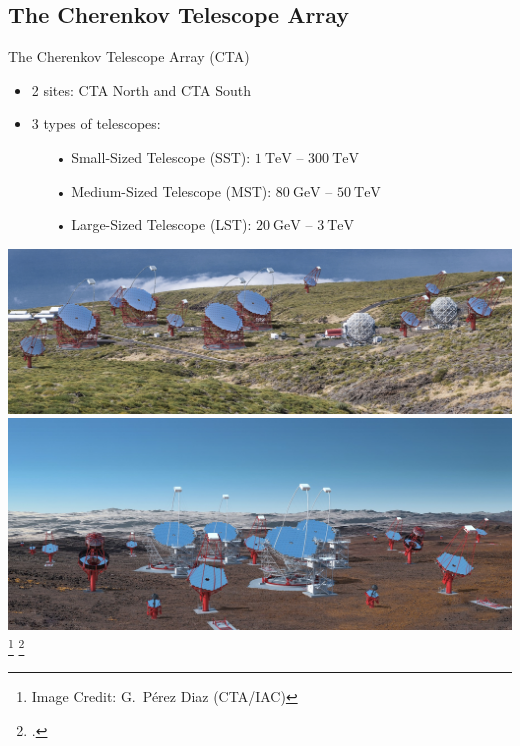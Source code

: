 \subsection{The Cherenkov Telescope Array}

\begin{frame}{The Cherenkov Telescope Array (CTA)}
  \begin{minipage}{0.55\textwidth}
    \begin{itemize}
      \setlength\itemsep{1em}
      \item 2 sites: CTA North and CTA South
      \item 3 types of telescopes:
      \begin{itemize}
        \setlength\itemsep{0.5em}
        \item [•] Small-Sized Telescope (SST): \;\(\SI{1}{\tera\eV}\) -- \(\SI{300}{\tera\eV}\)
        \item [•] Medium-Sized Telescope (MST): \;\(\SI{80}{\giga\eV}\) -- \(\SI{50}{\tera\eV}\)
        \item [•] Large-Sized Telescope (LST): \;\(\SI{20}{\giga\eV}\) -- \(\SI{3}{\tera\eV}\)
      \end{itemize}
    \end{itemize}
  \end{minipage}
  \begin{minipage}{0.42\textwidth}
    \begin{center}
      \includegraphics[width=\textwidth]{graphics/cta_north_render.jpg}
      \includegraphics[width=\textwidth]{graphics/cta_south_render.jpg}
      \ifdefined\darktheme
        \footnote{\textcolor{white!85!black}{Image Credit: G.~Pérez Diaz (CTA/IAC)}}
      \else
        \footcite[\textcolor{darkgray!85!black}{Image Credit:}][]{perezdiaz}
      \fi
    \end{center}
  \end{minipage}
\end{frame}


